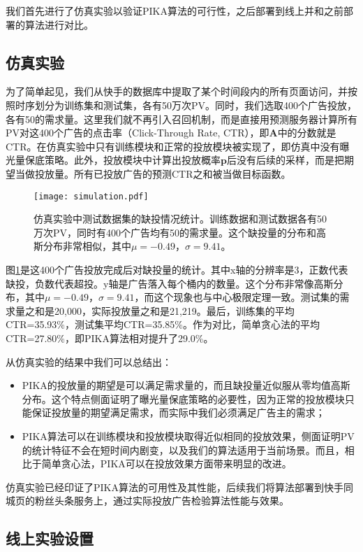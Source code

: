 我们首先进行了仿真实验以验证PIKA算法的可行性，之后部署到线上并和之前部署的算法进行对比。

\subsection{仿真实验}

为了简单起见，我们从快手的数据库中提取了某个时间段内的所有页面访问，并按照时序划分为训练集和测试集，各有50万次PV。同时，我们选取400个广告投放，各有50的需求量。这里我们就不再引入召回机制，而是直接用预测服务器计算所有PV对这400个广告的点击率（Click-Through Rate, CTR），即$\bm{A}$中的分数就是CTR。在仿真实验中只有训练模块和正常的投放模块被实现了，即仿真中没有曝光量保底策略。此外，投放模块中计算出投放概率$\bm{p}$后没有后续的采样，而是把期望当做投放量。所有已投放广告的预测CTR之和被当做目标函数。

\begin{figure}[tb]
	\centering
	\texttt{[image: simulation.pdf]}
	\caption{仿真实验中测试数据集的缺投情况统计。训练数据和测试数据各有50万次PV，同时有400个广告均有50的需求量。这个缺投量的分布和高斯分布非常相似，其中$\mu = -0.49$，$\sigma = 9.41$。}
	\label{fig:delivery}
\end{figure}

图\ref{fig:delivery}是这400个广告投放完成后对缺投量的统计。其中x轴的分辨率是3，正数代表缺投，负数代表超投。y轴是广告落入每个桶内的数量。这个分布非常像高斯分布，其中$\mu = -0.49$，$\sigma = 9.41$，而这个现象也与中心极限定理一致。测试集的需求量之和是20,000，实际投放量之和是21,219。最后，训练集的平均CTR=35.93\%，测试集平均CTR=35.85\%。作为对比，简单贪心法的平均CTR=27.80\%，即PIKA算法相对提升了29.0\%。

从仿真实验的结果中我们可以总结出：
\begin{itemize}
	\item PIKA的投放量的期望是可以满足需求量的，而且缺投量近似服从零均值高斯分布。这个特点侧面证明了曝光量保底策略的必要性，因为正常的投放模块只能保证投放量的期望满足需求，而实际中我们必须满足广告主的需求；
	\item PIKA算法可以在训练模块和投放模块取得近似相同的投放效果，侧面证明PV的统计特征不会在短时间内剧变，以及我们的算法适用于当前场景。而且，相比于简单贪心法，PIKA可以在投放效果方面带来明显的改进。
\end{itemize}

仿真实验已经印证了PIKA算法的可用性及其性能，后续我们将算法部署到快手同城页的粉丝头条服务上，通过实际投放广告检验算法性能与效果。

\subsection{线上实验设置}

